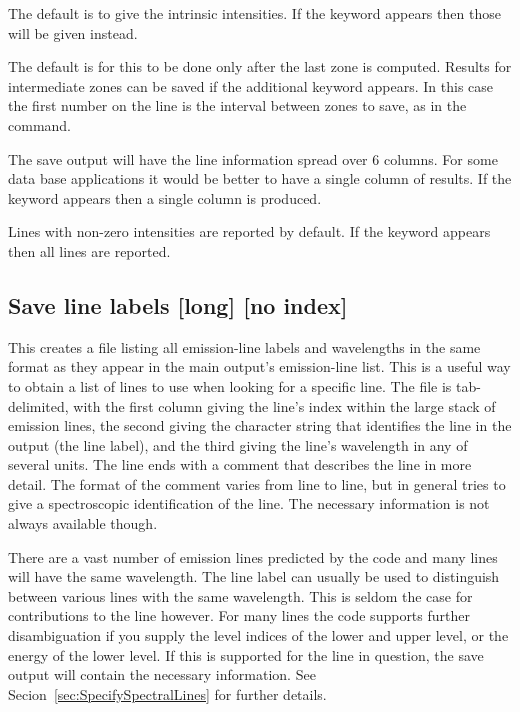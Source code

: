 The default is to give the intrinsic intensities.
If the keyword  appears then
those will be given instead.

The default is for this to be done
only after the last zone is computed.  Results for intermediate zones can
be saved if the additional keyword  appears.
In this case the first
number on the line is the interval between zones to save,
as in the  command.

The save output will have the line information spread over 6 columns.
For some data base applications it would be better to have a single column
of results.  If the keyword  appears then a single column is produced.

Lines with non-zero intensities are reported by default.  
If the keyword  appears then all lines are reported.

\subsection{Save line labels [long] [no index]}
\label{sec:SaveLineLabels}

This creates a file listing all emission-line labels and wavelengths
in the same format as they appear in the main output's emission-line list.
This is a useful way to obtain a list of lines to use when looking for a
specific line.  The file is tab-delimited, with the first column giving
the line's index within the large stack of emission lines, the second giving
the character string that identifies the line in the output (the line label), and the third giving
the line's wavelength in any of several units.  The line ends with a
comment that describes the line in more detail.  The format of the comment
varies from line to line, but in general tries to give a spectroscopic
identification of the line. The necessary information is not always available though.

There are a vast number of emission lines predicted by the code and many
lines will have the same wavelength.  The line label can usually be used
to distinguish between various lines with the same wavelength. This is seldom
the case for contributions to the line however.  For many lines the code
supports further disambiguation if you supply the level indices of the lower
and upper level, or the energy of the lower level.  If this is supported for
the line in question, the save output will contain the necessary information.
See Secion~\ref{sec:SpecifySpectralLines} for further details.

